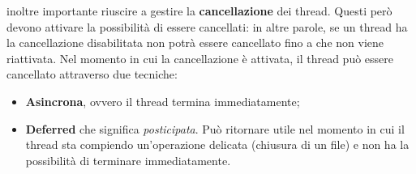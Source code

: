  inoltre importante riuscire a gestire la \textbf{cancellazione} dei thread. Questi però devono attivare la possibilità di essere cancellati: in altre parole, se un thread ha la cancellazione disabilitata non potrà essere cancellato fino a che non viene riattivata. Nel momento in cui la cancellazione è attivata, il thread può essere cancellato attraverso due tecniche:
\vspace{-5px}
\begin{itemize}
\setlength{\itemsep}{-.15 em}
    \item \textbf{Asincrona}, ovvero il thread termina immediatamente;
    \item \textbf{Deferred} che significa \textit{posticipata}. Può ritornare utile nel momento in cui il thread sta compiendo un'operazione delicata (chiusura di un file) e non ha la possibilità di terminare immediatamente. 
\end{itemize}


